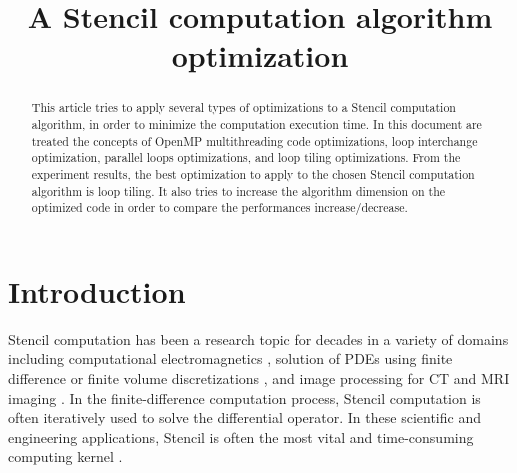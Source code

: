\documentclass[conference]{IEEEtran}
\begin{document}
\title{A Stencil computation algorithm optimization}


\author{
}

\maketitle

\begin{abstract}
This article tries to apply several types of optimizations to a Stencil computation algorithm, in order to minimize the computation execution time. In this document are treated the concepts of OpenMP multithreading code optimizations, loop interchange optimization, parallel loops optimizations, and loop tiling optimizations. From the experiment results, the best optimization to apply to the chosen Stencil computation algorithm is loop tiling. It also tries to increase the algorithm dimension on the optimized code in order to compare the performances increase/decrease.
\end{abstract}

\section{Introduction}\label{sec:intro}

Stencil computation has been a research topic for decades in a variety of domains including computational electromagnetics \cite{taflove}, solution of PDEs using finite difference or finite volume discretizations \cite{smith}, and image processing for CT and MRI imaging \cite{cong-huang-zou}\cite{cong-zou}. In the finite-difference computation process, Stencil computation is often iteratively used to solve the differential operator. In these scientific and engineering applications, Stencil is often the most vital and time-consuming computing kernel \cite{su-zhang-mei}.
\end{document}
